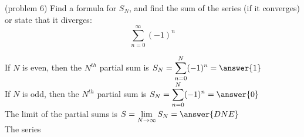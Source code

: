 \documentclass[handout]{ximera}
\begin{document}
\begin{problem}(problem 6)
Find a formula for $S_N$, and find the sum of the series (if it converges) or state that it diverges:
\[
\sum_{n=0}^\infty  (-1)^n 
\]

If $N$ is even, then the $N^{th}$ partial sum is  $\displaystyle S_N = \sum_{n=0}^N  (-1)^n
 =  \answer{1}$\\

If $N$ is odd, then the $N^{th}$ partial sum is  $\displaystyle S_N = \sum_{n=0}^N  (-1)^n
 =  \answer{0}$\\


The limit of the partial sums is $\displaystyle S = \lim_{N\to \infty}S_N = \answer{DNE}$\\

The series 

\end{problem}
\end{document}
